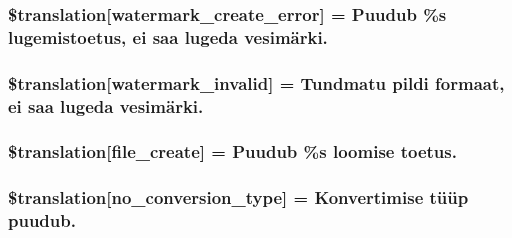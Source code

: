 \subsubsection[{\$translation}]{\setlength{\rightskip}{0pt plus 5cm}\$translation\mbox{[}\textquotesingle{}watermark\+\_\+create\+\_\+error\textquotesingle{}\mbox{]} = \textquotesingle{}Puudub \%s lugemistoetus, ei saa lugeda vesimärki.\textquotesingle{}}\label{class_8upload_8et___e_e_8php_aabca0b65dadbc6184415c16375f284ca}
\hypertarget{class_8upload_8et___e_e_8php_ac336e7a5701e47ba4a05e9e498a3cc44}{}
\subsubsection[{\$translation}]{\setlength{\rightskip}{0pt plus 5cm}\$translation\mbox{[}\textquotesingle{}watermark\+\_\+invalid\textquotesingle{}\mbox{]} = \textquotesingle{}Tundmatu pildi formaat, ei saa lugeda vesimärki.\textquotesingle{}}\label{class_8upload_8et___e_e_8php_ac336e7a5701e47ba4a05e9e498a3cc44}
\hypertarget{class_8upload_8et___e_e_8php_a1ecb4673e4fb69e06b3f20b65cecf30a}{}
\subsubsection[{\$translation}]{\setlength{\rightskip}{0pt plus 5cm}\$translation\mbox{[}\textquotesingle{}file\+\_\+create\textquotesingle{}\mbox{]} = \textquotesingle{}Puudub \%s loomise toetus.\textquotesingle{}}\label{class_8upload_8et___e_e_8php_a1ecb4673e4fb69e06b3f20b65cecf30a}
\hypertarget{class_8upload_8et___e_e_8php_a4712d7ec28e9a7f17eb3338af2358363}{}
\subsubsection[{\$translation}]{\setlength{\rightskip}{0pt plus 5cm}\$translation\mbox{[}\textquotesingle{}no\+\_\+conversion\+\_\+type\textquotesingle{}\mbox{]} = \textquotesingle{}Konvertimise tüüp puudub.\textquotesingle{}}\label{class_8upload_8et___e_e_8php_a4712d7ec28e9a7f17eb3338af2358363}
\hypertarget{class_8upload_8et___e_e_8php_a783c9358bcf54a054545b50098bc679b}{}

